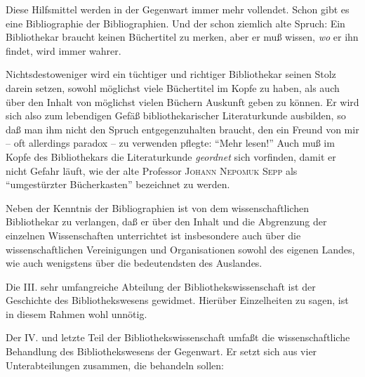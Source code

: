\documentclass[a4paper,
fontsize=11pt,
oneside,
numbers=noperiodatend,
parskip=half-,
bibliography=totoc,
final
]{scrartcl}
\begin{document}
Diese Hilfsmittel werden in der Gegenwart immer mehr vollendet. Schon
gibt es eine Bibliographie der Bibliographien. Und der schon ziemlich
alte Spruch: Ein Bibliothekar braucht keinen Büchertitel zu merken, aber
er muß wissen, \emph{wo} er ihn findet, wird immer wahrer.

Nichtsdestoweniger wird ein tüchtiger und richtiger Bibliothekar seinen
Stolz darein setzen, sowohl möglichst viele Büchertitel im Kopfe zu
haben, als auch über den Inhalt von möglichst vielen Büchern Auskunft
geben zu können. Er wird sich also zum lebendigen Gefäß
bibliothekarischer Literaturkunde ausbilden, so daß man ihm nicht den
Spruch entgegenzuhalten braucht, den ein Freund von mir -- oft
allerdings paradox -- zu verwenden pflegte: \enquote{Mehr lesen!} Auch
muß im Kopfe des Bibliothekars die Literaturkunde \emph{geordnet} sich
vorfinden, damit er nicht Gefahr läuft, wie der alte Professor
\textsc{Johann Nepomuk Sepp} als \enquote{umgestürzter Bücherkasten}
bezeichnet zu werden.

Neben der Kenntnis der Bibliographien ist von dem wissenschaftlichen
Bibliothekar zu verlangen, daß er über den Inhalt und die Abgrenzung der
einzelnen Wissenschaften unterrichtet ist insbesondere auch über die
wissenschaftlichen Vereinigungen und Organisationen sowohl des eigenen
Landes, wie auch wenigstens über die bedeutendsten des Auslandes.

Die III. sehr umfangreiche Abteilung der Bibliothekswissenschaft ist der
Geschichte des Bibliothekswesens gewidmet. Hierüber Einzelheiten zu
sagen, ist in diesem Rahmen wohl unnötig.

Der IV. und letzte Teil der Bibliothekswissenschaft umfaßt die
wissenschaftliche Behandlung des Bibliothekswesens der Gegenwart. Er
setzt sich aus vier Unterabteilungen zusammen, die behandeln sollen:
\end{document}
